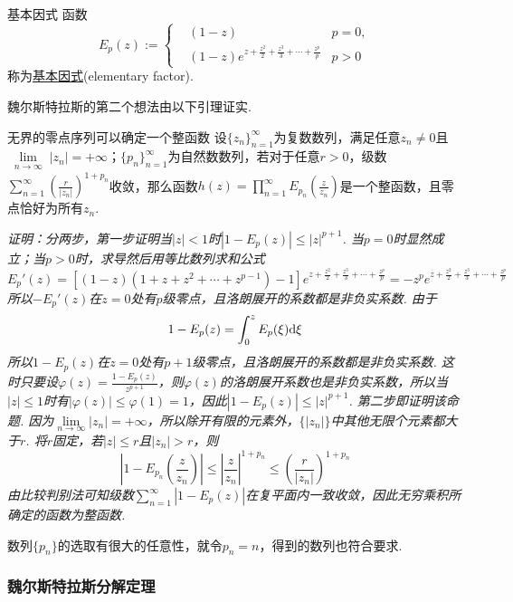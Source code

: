 \documentclass[main.tex]{subfiles}
\begin{document}
\begin{definition}{基本因式}
    函数
    \[E_p(z) := \left\{\begin{aligned} & (1-z) & p=0, \\ & (1-z)e^{z+\frac{z^2}{2}+\frac{z^3}{3}+\cdots+\frac{z^p}{p}} & p > 0 \end{aligned}\right.\]
    称为\uline{基本因式}(elementary factor).
\end{definition}

魏尔斯特拉斯的第二个想法由以下引理证实.
\begin{lemma}{无界的零点序列可以确定一个整函数}
    设\(\{z_n\}_{n=1}^{\infty}\)为复数数列，满足任意\(z_n \neq 0\)且\(\lim \limits_{\substack{n \to \infty}} |z_n|=+\infty\)；\(\{p_n\}_{n=1}^{\infty}\)为自然数数列，若对于任意\(r>0\)，级数\(\displaystyle{\sum_{n=1}^{\infty}\left(\frac{r}{|z_n|}\right)^{1+p_n}}\)收敛，那么函数\(\displaystyle{h(z)=\prod_{n=1}^{\infty}E_{p_n}\left(\frac{z}{z_n}\right)}\)是一个整函数，且零点恰好为所有\(z_n\).
\end{lemma}
\textit{
    证明：分两步，第一步证明当\(|z|<1\)时\(|1-E_p(z)| \leq |z|^{p+1}\). 当\(p=0\)时显然成立；当\(p > 0\)时，求导然后用等比数列求和公式
    \[E_p'(z) = [(1-z)(1+z+z^2+\cdots+z^{p-1})-1]e^{z+\frac{z^2}{2}+\frac{z^3}{3}+\cdots+\frac{z^p}{p}} = -z^pe^{z+\frac{z^2}{2}+\frac{z^3}{3}+\cdots+\frac{z^p}{p}}\]
    所以\(-E_p'(z)\)在\(z=0\)处有\(p\)级零点，且洛朗展开的系数都是非负实系数. 由于
    \[1-E_p(z)=\int_0^z E_p(\xi){\rm d}\xi\]
    所以\(1-E_p(z)\)在\(z=0\)处有\(p+1\)级零点，且洛朗展开的系数都是非负实系数. 这时只要设\(\displaystyle{\varphi(z)=\frac{1-E_p(z)}{z^{p+1}}}\)，则\(\varphi(z)\)的洛朗展开系数也是非负实系数，所以当\(|z| \leq 1\)时有\(|\varphi(z)|\leq \varphi(1)=1\)，因此\(|1-E_p(z)| \leq |z|^{p+1}\).
    第二步即证明该命题. 因为\(\lim \limits_{n \to \infty} |z_n| = +\infty\)，所以除开有限的元素外，\(\{|z_n|\}\)中其他无限个元素都大于\(r\). 将\(r\)固定，若\(|z|\leq r\)且\(|z_n|>r\)，则
    \[\left|1-E_{p_n}\left(\frac{z}{z_n}\right)\right| \leq \left|\frac{z}{z_n}\right|^{1+p_n} \leq \left(\frac{r}{|z_n|}\right)^{1+p_n}\]
    由比较判别法可知级数\(\displaystyle{\sum_{n=1}^{\infty}|1-E_p(z)|}\)在复平面内一致收敛，因此无穷乘积所确定的函数为整函数.
}

数列\(\{p_n\}\)的选取有很大的任意性，就令\(p_n=n\)，得到的数列也符合要求.

\subsubsection{魏尔斯特拉斯分解定理}
\end{document}

